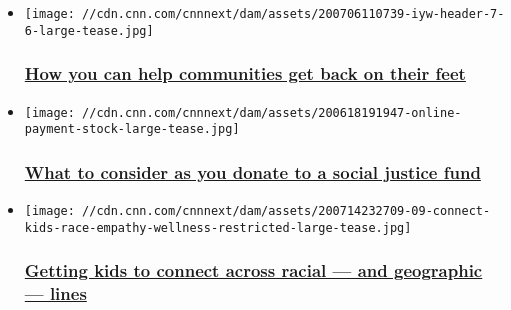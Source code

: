 \begin{itemize}
\item
  \href{/2020/06/03/us/help-businesses-and-communities-george-floyd-riot-recovery-iyw-trnd/index.html}{}

  \texttt{[image: //cdn.cnn.com/cnnnext/dam/assets/200706110739-iyw-header-7-6-large-tease.jpg]}

  \hypertarget{how-you-can-help-communities-get-back-on-their-feet}{%
  \subsubsection{\texorpdfstring{\href{/2020/06/03/us/help-businesses-and-communities-george-floyd-riot-recovery-iyw-trnd/index.html}{How
  you can help communities get back on their
  feet}}{How you can help communities get back on their feet}}\label{how-you-can-help-communities-get-back-on-their-feet}}
\item
  \href{/2020/06/19/us/how-to-donate-social-justice-funds-trnd/index.html}{}

  \texttt{[image: //cdn.cnn.com/cnnnext/dam/assets/200618191947-online-payment-stock-large-tease.jpg]}

  \hypertarget{what-to-consider-as-you-donate-to-a-social-justice-fund}{%
  \subsubsection{\texorpdfstring{\href{/2020/06/19/us/how-to-donate-social-justice-funds-trnd/index.html}{What
  to consider as you donate to a social justice
  fund}}{What to consider as you donate to a social justice fund}}\label{what-to-consider-as-you-donate-to-a-social-justice-fund}}
\item
  \href{/2020/07/15/health/connect-kids-race-empathy-wellness/index.html}{}

  \texttt{[image: //cdn.cnn.com/cnnnext/dam/assets/200714232709-09-connect-kids-race-empathy-wellness-restricted-large-tease.jpg]}

  \hypertarget{getting-kids-to-connect-across-racial--and-geographic--lines}{%
  \subsubsection{\texorpdfstring{\href{/2020/07/15/health/connect-kids-race-empathy-wellness/index.html}{Getting
  kids to connect across racial --- and geographic ---
  lines}}{Getting kids to connect across racial --- and geographic --- lines}}\label{getting-kids-to-connect-across-racial--and-geographic--lines}}
\end{itemize}

